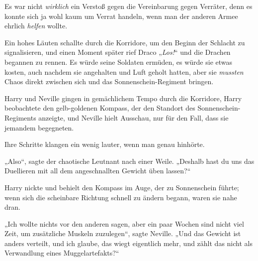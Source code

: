 Es war nicht \emph{wirklich} ein Verstoß gegen die Vereinbarung gegen Verräter, denn es konnte sich ja wohl kaum um Verrat handeln, wenn man der anderen Armee ehrlich \emph{helfen} wollte.

Ein hohes Läuten schallte durch die Korridore, um den Beginn der Schlacht zu signalisieren, und einen Moment später rief Draco „\emph{Los!}“ und die Drachen begannen zu rennen. Es würde seine Soldaten ermüden, es würde sie etwas kosten, auch nachdem sie angehalten und Luft geholt hatten, aber sie \emph{mussten} Chaos direkt zwischen sich und das Sonnenschein-Regiment bringen.

\later

Harry und Neville gingen in gemächlichem Tempo durch die Korridore, Harry beobachtete den gelb-goldenen Kompass, der den Standort des Sonnenschein-Regiments anzeigte, und Neville hielt Ausschau, nur für den Fall, dass sie jemandem begegneten.

Ihre Schritte klangen ein wenig lauter, wenn man genau hinhörte.

„Also“, sagte der chaotische Leutnant nach einer Weile. „Deshalb hast du uns das Duellieren mit all dem angeschnallten Gewicht üben lassen?“

Harry nickte und behielt den Kompass im Auge, der zu Sonnenschein führte; wenn sich die scheinbare Richtung schnell zu ändern begann, waren sie nahe dran.

„Ich wollte nichts vor den anderen sagen, aber ein paar Wochen sind nicht viel Zeit, um zusätzliche Muskeln zuzulegen“, sagte Neville. „Und das Gewicht ist anders verteilt, und ich glaube, das wiegt eigentlich mehr, und zählt das nicht als Verwandlung eines Muggelartefakts?“

